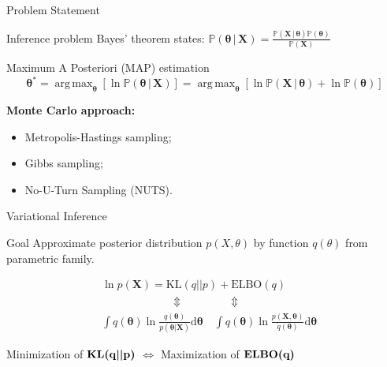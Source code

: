 \documentclass{beamer}
\DeclareMathOperator*{\argmax}{arg\,max}
\begin{document}
\begin{frame}{Problem Statement}
	\begin{block}{Inference problem}
			Bayes' theorem states:
			$\displaystyle
			\mathbb{P}(\bm{\theta}\,|\,\mathbf{X}) = \frac{\mathbb{P}(\mathbf{X}\,|\,\bm{\theta}) \mathbb{P}(\bm{\theta})}{\mathbb{P}(\mathbf{X})}
			$
	\end{block}
	\begin{block}{Maximum A Posteriori (MAP) estimation}
		\vspace{-0.3cm}
	\[
	\bm{\theta}^* = \argmax_{\bm{\theta}} \left[\ln\mathbb{P}(\bm{\theta}\,|\,\mathbf{X})\right] =\argmax_{\bm{\theta}} \left[\ln\mathbb{P}(\mathbf{X}\,|\,\bm{\theta}) + \ln\mathbb{P}(\bm{\theta})\right]
	\]
	\end{block}
	\vfill
	\textbf{Monte Carlo approach:}
	\begin{itemize}
		\item Metropolis-Hastings sampling;
		\item Gibbs sampling;
		\item No-U-Turn Sampling (NUTS).
	\end{itemize}
\end{frame}
\begin{frame}{Variational Inference}
	\begin{block}{Goal}
	Approximate posterior distribution $p(X, \theta)$ by function $q(\theta)$ from parametric family.
	\end{block}
	\begin{align*}
		&\ln p(\mathbf{X}) = \text{KL}(q||p) + \text{ELBO}(q)\\
		&\qquad\qquad\:\qquad\Updownarrow\qquad\qquad\Updownarrow\\
		&\int q(\bm{\theta}) \ln \frac{q(\bm{\theta})}{p(\bm{\theta}|\mathbf{X})} \text{d}\bm{\theta}
	\quad
		\int q(\bm{\theta}) \ln \frac{p(\mathbf{X}, \bm{\theta})}{q(\bm{\theta})} \text{d}\bm{\theta}
	\end{align*}
	\vspace{-0.3cm}
	\begin{block}{}
		\begin{center}
			Minimization of $\mathbf{\text{\textbf{KL}}\bm{(}q\bm{||}p\bm{)}}$ $\bm\Leftrightarrow$ Maximization of $\mathbf{\text{\textbf{ELBO}}\bm{(}q\bm{)}}$			
		\end{center}
	\end{block}
\end{frame}
\end{document}
